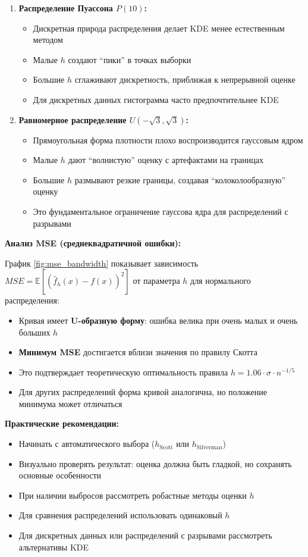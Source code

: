 \documentclass[a4paper,14pt]{extarticle}
\begin{document}
\begin{enumerate}
    \item \textbf{Распределение Пуассона $P(10)$:}
    \begin{itemize}
        \item Дискретная природа распределения делает KDE менее естественным методом
        \item Малые $h$ создают ``пики'' в точках выборки
        \item Большие $h$ сглаживают дискретность, приближая к непрерывной оценке
        \item Для дискретных данных гистограмма часто предпочтительнее KDE
    \end{itemize}
    
    \item \textbf{Равномерное распределение $U(-\sqrt{3}, \sqrt{3})$:}
    \begin{itemize}
        \item Прямоугольная форма плотности плохо воспроизводится гауссовым ядром
        \item Малые $h$ дают ``волнистую'' оценку с артефактами на границах
        \item Большие $h$ размывают резкие границы, создавая ``колоколообразную'' оценку
        \item Это фундаментальное ограничение гауссова ядра для распределений с разрывами
    \end{itemize}
\end{enumerate}

\textbf{Анализ MSE (среднеквадратичной ошибки):}

График \ref{fig:mse_bandwidth} показывает зависимость $MSE = \mathbb{E}[(\hat{f}_h(x) - f(x))^2]$ от параметра $h$ для нормального распределения:

\begin{itemize}
    \item Кривая имеет \textbf{U-образную форму}: ошибка велика при очень малых и очень больших $h$
    \item \textbf{Минимум MSE} достигается вблизи значения по правилу Скотта
    \item Это подтверждает теоретическую оптимальность правила $h = 1.06 \cdot \sigma \cdot n^{-1/5}$
    \item Для других распределений форма кривой аналогична, но положение минимума может отличаться
\end{itemize}

\textbf{Практические рекомендации:}
\begin{itemize}
    \item Начинать с автоматического выбора ($h_{\text{Scott}}$ или $h_{\text{Silverman}}$)
    \item Визуально проверять результат: оценка должна быть гладкой, но сохранять основные особенности
    \item При наличии выбросов рассмотреть робастные методы оценки $h$
    \item Для сравнения распределений использовать одинаковый $h$
    \item Для дискретных данных или распределений с разрывами рассмотреть альтернативы KDE
\end{itemize}
\end{document}

